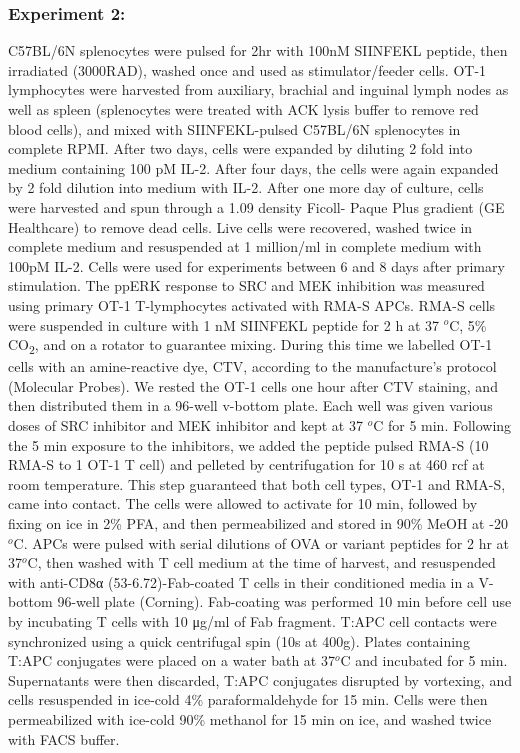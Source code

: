 \documentclass[11pt,a4paper,final]{article}
\begin{document}
\subsubsection*{Experiment 2:} C57BL/6N splenocytes were pulsed for 2hr with 100nM SIINFEKL peptide, then irradiated (3000RAD), washed once and used as stimulator/feeder cells. OT-1 lymphocytes were harvested from auxiliary, brachial and inguinal lymph nodes as well as spleen (splenocytes were treated with ACK lysis buffer to remove red blood cells), and mixed with SIINFEKL-pulsed C57BL/6N splenocytes in complete RPMI. After two days, cells were expanded by diluting 2 fold into medium containing 100 pM IL-2. After four days, the cells were again expanded by 2 fold dilution into medium with IL-2. After one more day of culture, cells were harvested and spun through a 1.09 density Ficoll- Paque Plus gradient (GE Healthcare) to remove dead cells. Live cells were recovered, washed twice in complete medium and resuspended at 1 million/ml in complete medium with 100pM IL-2. Cells were used for experiments between 6 and 8 days after primary stimulation. The ppERK response to SRC and MEK inhibition was measured using primary OT-1 T-lymphocytes activated with RMA-S APCs. RMA-S cells were suspended in culture with 1 nM SIINFEKL peptide for 2 h at 37 $^o$C, 5\% CO\textsubscript{2}, and on a rotator to guarantee mixing. During this time we labelled OT-1 cells with an amine-reactive dye, CTV, according to the manufacture’s protocol (Molecular Probes). We rested the OT-1 cells one hour after CTV staining, and then distributed them in a 96-well v-bottom plate. Each well was given various doses of SRC inhibitor and MEK inhibitor and kept at 37 $^o$C for 5 min. Following the 5 min exposure to the inhibitors, we added the peptide pulsed RMA-S (10 RMA-S to 1 OT-1 T cell) and pelleted by centrifugation for 10 s at 460 rcf at room temperature. This step guaranteed that both cell types, OT-1 and RMA-S, came into contact. The cells were allowed to activate for 10 min, followed by fixing on ice in 2\% PFA, and then permeabilized and stored in 90\% MeOH at  -20 $^o$C. APCs were pulsed with serial dilutions of OVA or variant peptides for 2 hr at 37$^o$C, then washed with T cell medium at the time of harvest, and resuspended with anti-CD8α (53-6.72)-Fab-coated T cells in their conditioned media in a V-bottom 96-well plate (Corning). Fab-coating was performed 10 min before cell use by incubating T cells with 10 μg/ml of Fab fragment. T:APC cell contacts were synchronized using a quick centrifugal spin (10s at 400g). Plates containing T:APC conjugates were placed on a water bath at 37$^o$C and incubated for 5 min. Supernatants were then discarded, T:APC conjugates disrupted by vortexing, and cells resuspended in ice-cold 4\% paraformaldehyde for 15 min. Cells were then permeabilized with ice-cold 90\% methanol for 15 min on ice, and washed twice with FACS buffer. 
\end{document}
